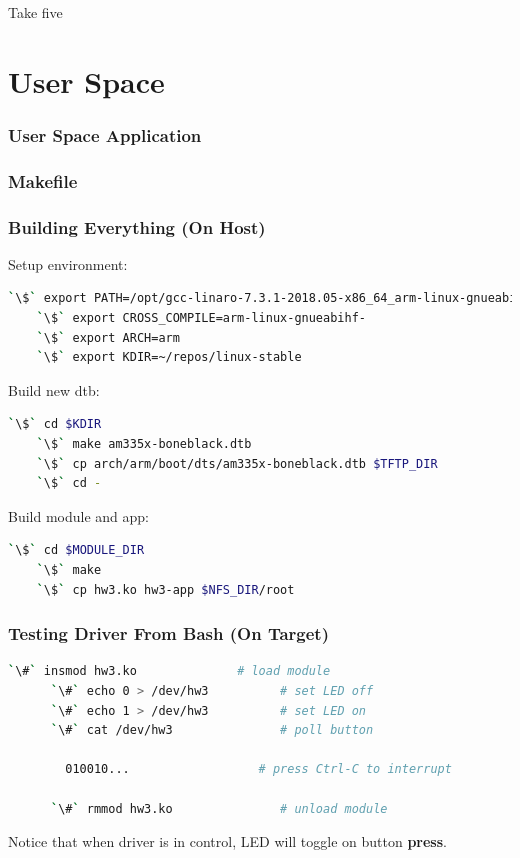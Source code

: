 \documentclass[aspectratio=169,usenames,dvipsnames]{beamer}
\newcounter{cont}
\begin{document}
\begin{frame}[standout]
  Take five
\end{frame}

\section{User Space}

\begin{frame}[containsverbatim,allowframebreaks=1]
  \frametitle{User Space Application}
  
\end{frame}

\begin{frame}[containsverbatim]
  \frametitle{Makefile}
  
  \vspace*{-5mm}
\end{frame}

\begin{frame}[containsverbatim]
  \frametitle{Building Everything (On Host)}
  Setup environment:
  \begin{lstlisting}[language=bash,numbers=none]
    `\$` export PATH=/opt/gcc-linaro-7.3.1-2018.05-x86_64_arm-linux-gnueabihf/bin:$PATH
    `\$` export CROSS_COMPILE=arm-linux-gnueabihf-
    `\$` export ARCH=arm
    `\$` export KDIR=~/repos/linux-stable
  \end{lstlisting}
  Build new dtb:
  \begin{lstlisting}[language=bash,numbers=none]
    `\$` cd $KDIR
    `\$` make am335x-boneblack.dtb
    `\$` cp arch/arm/boot/dts/am335x-boneblack.dtb $TFTP_DIR
    `\$` cd -
  \end{lstlisting}
  Build module and app:
  \begin{lstlisting}[language=bash,numbers=none]
    `\$` cd $MODULE_DIR
    `\$` make
    `\$` cp hw3.ko hw3-app $NFS_DIR/root
  \end{lstlisting}
\end{frame}

\begin{frame}[containsverbatim]
  \frametitle{Testing Driver From Bash (On Target)}
  \begin{lstlisting}[language=bash,numbers=none]
      `\#` insmod hw3.ko              # load module
      `\#` echo 0 > /dev/hw3          # set LED off
      `\#` echo 1 > /dev/hw3          # set LED on
      `\#` cat /dev/hw3               # poll button

        010010...                  # press Ctrl-C to interrupt

      `\#` rmmod hw3.ko               # unload module
  \end{lstlisting}
  Notice that when driver is in control, LED will toggle on button
  \textbf{press}.
\end{frame}
\end{document}
